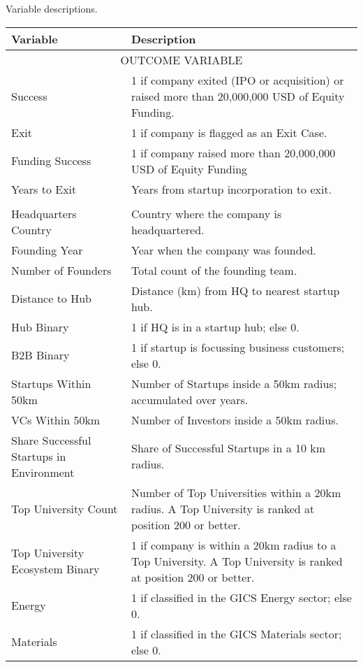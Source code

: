 \centering
{\footnotesize
\caption{Variable descriptions.}
\label{tab:var_desc}
\begin{tabular}{p{} p{}}
\toprule
Variable & Description \\
\midrule
\multicolumn{2}{c}{\tiny\textsc{OUTCOME VARIABLE}} \\
\midrule
Success & 1 if company exited (IPO or acquisition) or raised more than 20,000,000 USD of Equity Funding. \\[0.4em]
Exit & 1 if company is flagged as an Exit Case. \\[0.4em]
Funding Success & 1 if company raised more than 20,000,000 USD of Equity Funding \\[0.4em]
Years to Exit & Years from startup incorporation to exit. \\[0.4em]
\addlinespace[0.5em]
\midrule
\multicolumn{2}{c}{\tiny\textsc{FUNDAMENTAL VARIABLES}} \\
\midrule
Headquarters Country & Country where the company is headquartered. \\[0.4em]
Founding Year & Year when the company was founded. \\[0.4em]
Number of Founders & Total count of the founding team. \\[0.4em]
Distance to Hub & Distance (km) from HQ to nearest startup hub. \\[0.4em]
Hub Binary & 1 if HQ is in a startup hub; else 0. \\[0.4em]
B2B Binary & 1 if startup is focussing business customers; else 0. \\[0.4em]
Startups Within 50km & Number of Startups inside a 50km radius; accumulated over years. \\[0.4em]
VCs Within 50km & Number of Investors inside a 50km radius. \\[0.4em]
Share Successful Startups in Environment & Share of Successful Startups in a 10 km radius. \\[0.4em]
Top University Count & Number of Top Universities within a 20km radius. A Top University is ranked at position 200 or better. \\[0.4em]
Top University Ecosystem Binary & 1 if company is within a 20km radius to a Top University. A Top University is ranked at position 200 or better. \\[0.4em]
Energy & 1 if classified in the GICS Energy sector; else 0. \\[0.4em]
Materials & 1 if classified in the GICS Materials sector; else 0. \\[0.4em]

\end{tabular}}
